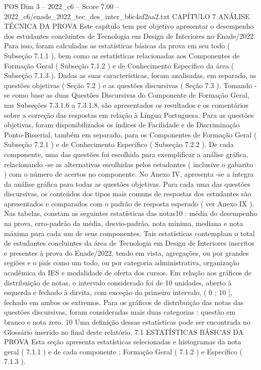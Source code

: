\begin{textsample}{POS Dim 3 – 2022\_c6 – Score 7.00 – 2022\_c6/enade\_2022\_tec\_des\_inter\_b6c4af2aa2.txt}  \label{ex:f3_pos_022}
CAPÍTULO 7 ANÁLISE TÉCNICA DA PROVA Este capítulo tem por objetivo apresentar o desempenho dos estudantes concluintes de Tecnologia em Design de Interiores no Enade/2022.
Para isso, foram calculadas as estatísticas básicas da prova em seu todo ( Subseção 7.1.1 ), bem como as estatísticas relacionadas aos Componentes de Formação Geral ( Subseção 7.1.2 ) e de Conhecimento Específico da área ( Subseção 7.1.3 ).
Dadas as suas características, foram analisadas, em separado, as questões objetivas ( Seção 7.2 ) e as questões discursivas ( Seção 7.3 ).
Tomando -se como base as duas Questões Discursivas do Componente de Formação Geral, nas Subseções 7.3.1.6 a 7.3.1.8, são apresentados os resultados e os comentários sobre a correção das respostas em relação à Língua Portuguesa.
Para as questões objetivas, foram disponibilizados os índices de Facilidade e de Discriminação Ponto-Bisserial, também em separado, para os Componentes de Formação Geral ( Subseção 7.2.1 ) e de Conhecimento Específico ( Subseção 7.2.2 ).
De cada componente, uma das questões foi escolhida para exemplificar a análise gráfica, relacionando -se as alternativas escolhidas pelos estudantes ( inclusive o gabarito ) com o número de acertos no componente.
No Anexo IV, apresenta -se a íntegra da análise gráfica para todas as questões objetivas.
Para cada uma das questões discursivas, os conteúdos dos tipos mais comuns de respostas dos estudantes são apresentados e comparados com o padrão de resposta esperado ( ver Anexo IX ).
Nas tabelas, constam as seguintes estatísticas das notas10 : média do desempenho na prova, erro-padrão da média, desvio-padrão, nota mínima, mediana e nota máxima para cada um de seus componentes.
Tais estatísticas contemplam o total de estudantes concluintes da área de Tecnologia em Design de Interiores inscritos e presentes à prova do Enade/2022, tendo em vista, agregações, ou por grandes regiões e o país como um todo, ou por categoria administrativa, organização acadêmica da IES e modalidade de oferta dos cursos.
Em relação aos gráficos de distribuição de notas, o intervalo considerado foi de 10 unidades, aberto à esquerda e fechado à direita, com exceção do primeiro intervalo, ( 0 ; 10 ], fechado em ambos os extremos.
Para os gráficos de distribuição das notas das questões discursivas, foram consideradas mais duas categorias : questão em branco e nota zero. 10 Uma definição dessas estatísticas pode ser encontrada no Glossário inserido no final deste relatório. 7.1 ESTATÍSTICAS BÁSICAS DA PROVA Esta seção apresenta estatísticas selecionadas e histogramas da nota geral ( 7.1.1 ) e de cada componente : Formação Geral ( 7.1.2 ) e Específico ( 7.1.3 ).

\end{textsample}
